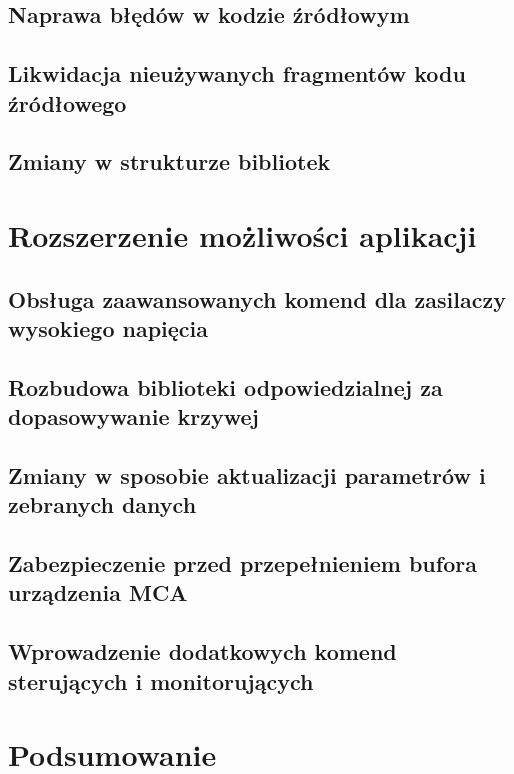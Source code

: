     \subsection{Naprawa błędów w kodzie źródłowym}
    \subsection{Likwidacja nieużywanych fragmentów kodu źródłowego}
    \subsection{Zmiany w strukturze bibliotek}

\section{Rozszerzenie możliwości aplikacji}
    
    \subsection{Obsługa zaawansowanych komend dla zasilaczy wysokiego napięcia}
    \subsection{Rozbudowa biblioteki odpowiedzialnej za dopasowywanie krzywej}
    \subsection{Zmiany w sposobie aktualizacji parametrów i zebranych danych}
    \subsection{Zabezpieczenie przed przepełnieniem bufora urządzenia MCA}
    \subsection{Wprowadzenie dodatkowych komend sterujących i monitorujących}

\section{Podsumowanie}
